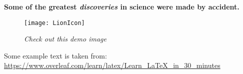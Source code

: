 \documentclass[12pt]{article}
\begin{document}
\textbf{Some of the greatest \emph{discoveries} 
in science were made by accident.}

\begin{figure}[h]
  \centering
  \texttt{[image: LionIcon]}
  \caption{\textit{Check out this demo image}}
\end{figure}

\vfill %

\noindent
{\small 
\begin{minipage}[b]{1\textwidth}
    Some example text is taken from: \url{https://www.overleaf.com/learn/latex/Learn_LaTeX_in_30_minutes}
\end{minipage}
} 
\vspace{-3mm} %
\end{document}
